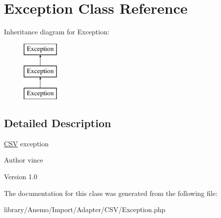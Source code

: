 \hypertarget{class_anemo_1_1_import_1_1_adapter_1_1_c_s_v_1_1_exception}{
\section{Exception Class Reference}
\label{class_anemo_1_1_import_1_1_adapter_1_1_c_s_v_1_1_exception}
}
Inheritance diagram for Exception:\begin{figure}[H]
\begin{center}
\leavevmode
\includegraphics[height=3.000000cm]{class_anemo_1_1_import_1_1_adapter_1_1_c_s_v_1_1_exception}
\end{center}
\end{figure}


\subsection{Detailed Description}
\hyperlink{class_anemo_1_1_import_1_1_adapter_1_1_c_s_v}{CSV} exception \begin{DoxyAuthor}{Author}
vince 
\end{DoxyAuthor}
\begin{DoxyVersion}{Version}
1.0 
\end{DoxyVersion}


The documentation for this class was generated from the following file:\begin{DoxyCompactItemize}
\item 
library/Anemo/Import/Adapter/CSV/Exception.php\end{DoxyCompactItemize}
